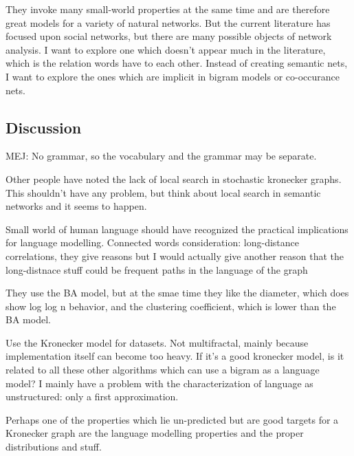 \documentclass[12pt]{article}
\begin{document}
They invoke many small-world properties at the same time and are therefore great models for a variety of natural networks. But the current literature has focused upon social networks, but there are many possible objects of network analysis. I want to explore one which doesn't appear much in the literature, which is the relation words have to each other. Instead of creating semantic nets, I want to explore the ones which are implicit in bigram models or co-occurance nets.

\subsection{Discussion} %
MEJ: No grammar, so the vocabulary and the grammar may be separate.

Other people have noted the lack of local search in stochastic kronecker graphs. This shouldn't have any problem, but think about local search in semantic networks and it seems to happen.

Small world of human language should have recognized the practical implications for language modelling. Connected words consideration: long-distance correlations, they give reasons but I would actually give another reason that the long-distnace stuff could be frequent paths in the language of the graph

They use the BA model, but at the smae time they like the diameter, which does show log log n behavior, and the clustering coefficient, which is lower than the BA model.


Use the Kronecker model for datasets. Not multifractal, mainly because implementation itself can become too heavy. If it's a good kronecker model, is it related to all these other algorithms which can use a bigram as a language model? I mainly have a problem with the characterization of language as unstructured: only a first approximation.

Perhaps one of the properties which lie un-predicted but are good targets for a Kronecker graph are the language modelling properties and the proper distributions and stuff.
\end{document}

